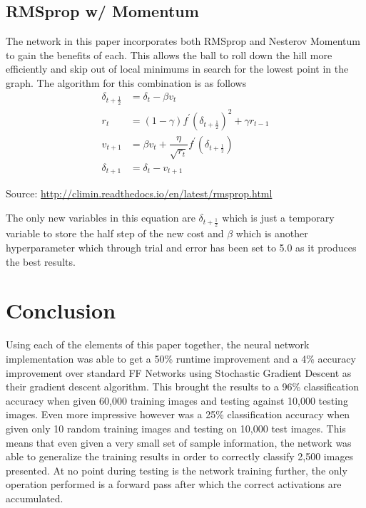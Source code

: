 \documentclass[12pt]{article}
\theoremstyle{definition}
\theoremstyle{plain}
\begin{document}
\subsection*{RMSprop w/ Momentum}
The network in this paper incorporates both RMSprop and Nesterov Momentum to gain the benefits of each. This allows the ball to roll down the hill more efficiently and skip out of local minimums in search for the lowest point in the graph. The algorithm for this combination is as follows
\begin{align*}
\delta_{t+\frac{1}{2}} &= \delta_t-\beta v_t\\
r_t &=(1-\gamma) f^\prime(\delta_{t+\frac{1}{2}})^2 + \gamma r_{t-1}\\
v_{t+1} &= \beta v_t + \dfrac{\eta}{\sqrt{r_t}}f^\prime(\delta_{t+\frac{1}{2}})\\
\delta_{t+1} &= \delta_t - v_{t+1}
\end{align*}
\begin{center}\small{Source: \url{http://climin.readthedocs.io/en/latest/rmsprop.html}}\end{center}

The only new variables in this equation are $\delta_{t+\frac{1}{2}}$ which is just a temporary variable to store the half step of the new cost and $\beta$ which is another hyperparameter which through trial and error has been set to 5.0 as it produces the best results.\\

\section*{Conclusion}
Using each of the elements of this paper together, the neural network implementation was able to get a 50\% runtime improvement and a 4\% accuracy improvement over standard FF Networks using Stochastic Gradient Descent as their gradient descent algorithm. This brought the results to a 96\% classification accuracy when given 60,000 training images and testing against 10,000 testing images. Even more impressive however was a 25\% classification accuracy when given only 10 random training images and testing on 10,000 test images. This means that even given a very small set of sample information, the network was able to generalize the training results in order to correctly classify 2,500 images presented. At no point during testing is the network training further, the only operation performed is a forward pass after which the correct activations are accumulated.
\end{document}
